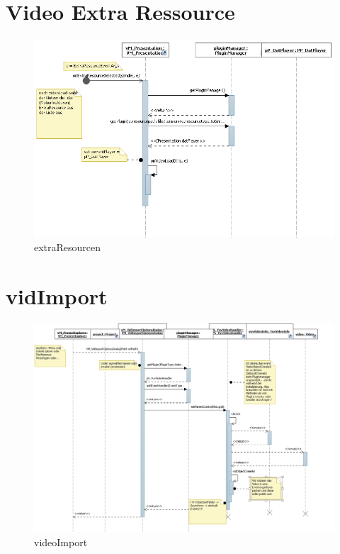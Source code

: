 \section{Video Extra Ressource}
\begin{figure}[H]
\includegraphics[width=\linewidth]{bilder/Sequenzdiagramm/extraResourcen.png}
\caption{extraResourcen}
\end{figure}

\section{vidImport}
\begin{figure}[H]
\includegraphics[width=\linewidth]{bilder/Sequenzdiagramm/videoImport.png}
\caption{videoImport}
\end{figure}